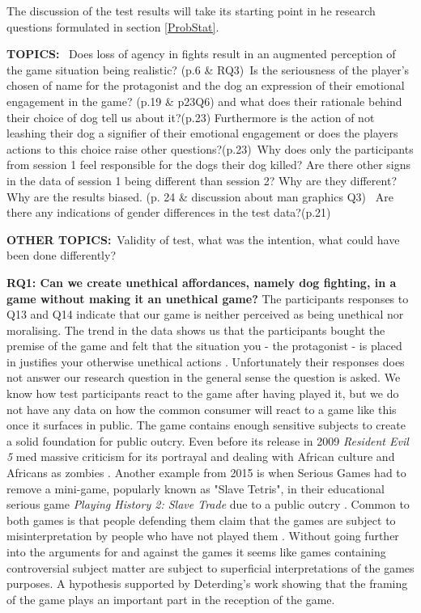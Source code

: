 The discussion of the test results will take its starting point in he research questions formulated in section \ref{ProbStat}. 


\textbf{TOPICS:} \
Does loss of agency in fights result in an augmented perception of the game situation being realistic? (p.6 \& RQ3)\
Is the seriousness of the player's chosen of name for the protagonist and the dog an expression of their emotional engagement in the game? (p.19 \& p23Q6) and what does their rationale behind their choice of dog tell us about it?(p.23) Furthermore is the action of not leashing their dog a signifier of their emotional engagement or does the players actions to this choice raise other questions?(p.23)\
Why does only the participants from session 1 feel responsible for the dogs their dog killed? Are there other signs in the data of session 1 being different than session 2? Why are they different? Why are the results biased. (p. 24 \& discussion about man graphics Q3) \
Are there any indications of gender differences in the test data?(p.21)


\textbf{OTHER TOPICS:}\
Validity of test, what was the intention, what could have been done differently?





\textbf{RQ1: Can we create unethical affordances, namely dog fighting, in a game without making it an unethical game?}
The participants responses to Q13 and Q14 indicate that our game is neither perceived as being unethical nor moralising. The trend in the data shows us that the participants bought the premise of the game and felt that the situation you - the protagonist - is placed in justifies your otherwise unethical actions . Unfortunately their responses does not answer our research question in the general sense the question is asked. We know how test participants react to the game after having played it, but we do not have any data on how the common consumer will react to a game like this once it surfaces in public. The game contains enough sensitive subjects to create a solid foundation for public outcry. Even before its release in 2009 \textit{Resident Evil 5} \citep[RE5]{game:re} med massive criticism for its portrayal and dealing with African culture and Africans as zombies \citep{harrer2015black}. Another example from 2015 is when Serious Games had to remove a mini-game, popularly known as "Slave Tetris", in their educational serious game \textit{Playing History 2: Slave Trade}  due to a public outcry \citep{kotaku}. Common to both games is that people defending them claim that the games are subject to misinterpretation by people who have not played them \citep{harrer2015black, kotaku, mtv}. Without going further into the arguments for and against the games it seems like games containing controversial subject matter are subject to superficial interpretations of the games purposes. A hypothesis supported by Deterding's \citeyear{deterding2016mechanic} work showing that the framing of the game plays an important part in the reception of the game.

